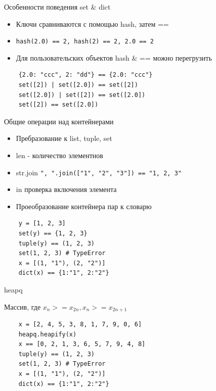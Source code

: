 \documentclass{article}
\begin{document}
\begin{center} Особенности поведения set \& dict \end{center}
\begin{itemize}
	\item Ключи сравниваются с помощью hash, затем ==
	\item \lstinline!hash(2.0) == 2, hash(2) == 2, 2.0 == 2!
	\item Для пользовательских объектов hash \& == можно перегрузить
\end{itemize}
\begin{lstlisting}
	{2.0: "ccc", 2: "dd"} == {2.0: "ccc"}
	set([2]) | set([2.0]) == set([2])
	set([2.0]) | set([2]) == set([2.0])
	set([2]) == set([2.0])
\end{lstlisting}
\newpage

\begin{center} Общие операции над контейнерами \end{center}
\begin{itemize}
	\item Пребразование к list, tuple, set
	\item len - количество элементнов
	\item str.join \lstinline!", ".join(["1", "2", "3"]) == "1, 2, 3"! 
	\item in проверка включения элемента
	\item Проеобразование контейнера пар к словарю 
\end{itemize}
\begin{lstlisting}
    y = [1, 2, 3]
    set(y) == {1, 2, 3}
    tuple(y) == (1, 2, 3)
    set(1, 2, 3) # TypeError
	x = [(1, "1"), (2, "2")]
	dict(x) == {1:"1", 2:"2"}
\end{lstlisting}
\newpage

\begin{center} heapq \end{center}
Массив, где $x_n >= x_{2n}, x_n >= x_{2n + 1}$
\begin{lstlisting}
    x = [2, 4, 5, 3, 8, 1, 7, 9, 0, 6]
    heapq.heapify(x)
    x == [0, 2, 1, 3, 6, 5, 7, 9, 4, 8]
    tuple(y) == (1, 2, 3)
    set(1, 2, 3) # TypeError
	x = [(1, "1"), (2, "2")]
	dict(x) == {1:"1", 2:"2"}
\end{lstlisting}
\newpage
\end{document}
